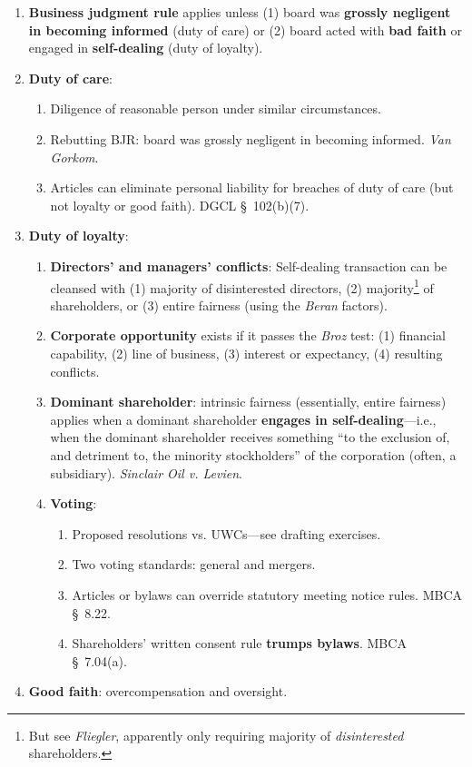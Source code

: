 \begin{enumerate}
    \item \textbf{Business judgment rule} applies unless (1) board was 
    \textbf{grossly negligent in becoming informed} (duty of care) or (2) 
    board acted with \textbf{bad faith} or engaged in \textbf{self-dealing} 
    (duty of loyalty).
    \item \textbf{Duty of care}:
    \begin{enumerate}
        \item Diligence of reasonable person under similar circumstances.
        \item Rebutting BJR: board was grossly negligent in becoming 
        informed. \emph{Van Gorkom}.
        \item Articles can eliminate personal liability for breaches of duty 
        of care (but not loyalty or good faith). DGCL \S\ 102(b)(7).
    \end{enumerate}
    \item \textbf{Duty of loyalty}:
    \begin{enumerate}
        \item \textbf{Directors' and managers' conflicts}: Self-dealing 
        transaction can be cleansed with (1) majority of disinterested 
        directors, (2) majority\footnote{But see \emph{Fliegler}, apparently 
        only requiring majority of \emph{disinterested} shareholders.} of 
        shareholders, or (3) entire fairness (using the \emph{Beran} factors).
        \item \textbf{Corporate opportunity} exists if it passes the 
        \emph{Broz} test: (1) financial capability, (2) line of business, (3) 
        interest or expectancy, (4) resulting conflicts.
        \item \textbf{Dominant shareholder}: intrinsic fairness (essentially, 
        entire fairness) applies when a dominant shareholder \textbf{engages 
        in self-dealing}---i.e., when the dominant shareholder receives 
        something ``to the exclusion of, and detriment to, the minority 
        stockholders'' of the corporation (often, a subsidiary).  
        \emph{Sinclair Oil v. Levien}.
        \item \textbf{Voting}:
        \begin{enumerate}
            \item Proposed resolutions vs. UWCs---see drafting exercises.
            \item Two voting standards: general and mergers.
            \item Articles or bylaws can override statutory meeting notice 
            rules. MBCA \S\ 8.22.
            \item Shareholders' written consent rule \textbf{trumps bylaws}. 
            MBCA \S\ 7.04(a). 
        \end{enumerate}
    \end{enumerate}
    \item \textbf{Good faith}: overcompensation and oversight.
\end{enumerate}
